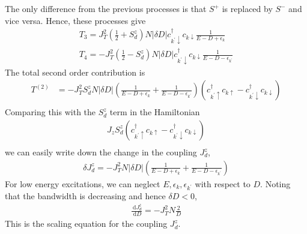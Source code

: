 \documentclass[twoside,11pt]{report}
\numberwithin{equation}{section}
\begin{document}
The only difference from the previous processes is that \(S^+\) is replaced by \(S^-\) and vice versa.
Hence, these  processes give
\begin{gather}
	T_3 = J_T^2\left(\frac{1}{2} + S_d^z\right)N|\delta D|c^\dagger_{k^\prime \downarrow}c_{k\downarrow}\frac{1}{E - D + \epsilon_k}\\
	T_4 = -J_T^2 \left(\frac{1}{2}-S_d^z\right) N |\delta D|c^\dagger_{k^\prime\downarrow} c_{k\downarrow} \frac{1}{E - D - \epsilon_{k^\prime}}
\end{gather}
The total second order contribution is
\begin{equation}\begin{aligned}
	T^{(2)} &= -J_T^2 S_d^z N|\delta D|\left(\frac{1}{E - D + \epsilon_k} + \frac{1}{E - D - \epsilon_{k^\prime}}\right)\left(c^\dagger_{k^\prime \uparrow}c_{k\uparrow} - c^\dagger_{k^\prime \downarrow}c_{k\downarrow}\right)\\
\end{aligned}\end{equation}
Comparing this with the \(S_d^z\) term in the Hamiltonian
\begin{equation}\begin{aligned}
	J_z S_d^z\left(c^\dagger_{k^\prime \uparrow}c_{k\uparrow} - c^\dagger_{k^\prime \downarrow}c_{k\downarrow}\right)\\
\end{aligned}\end{equation}
we can easily write down the change in the coupling \(J_d^z\),
\begin{equation}\begin{aligned}
	\delta J_d^z = -J_T^2 N|\delta D|\left(\frac{1}{E - D + \epsilon_k} + \frac{1}{E - D - \epsilon_{k^\prime}}\right)
\end{aligned}\end{equation}
For low energy excitations, we can neglect \(E, \epsilon_k, \epsilon_{k^\prime}\) with respect to \(D\).
Noting that the bandwidth is decreasing and hence \(\delta D < 0\),
\begin{equation}\begin{aligned}
	\frac{\:\mathrm{d}J_d^z}{\:\mathrm{d}D}=-J_T^2N \frac{2}{D}
\end{aligned}\end{equation}
This is the scaling equation for the coupling \(J_d^z\).
\end{document}

